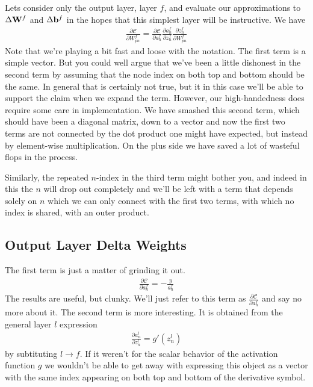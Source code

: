 \documentclass[twocolumn]{revtex4-1}
\newcommand{\bld}[1]{\vectorbold{#1}}
\newcommand{\cC}{\mathscr{C}}
\newcommand{\parpar}[2]{\frac{\partial #1}{\partial #2}}
\begin{document}
Lets consider only the output layer, layer $f$, and evaluate our approximations to $\Delta \bld{W}^f$ and $\Delta \bld{b}^f$ in the hopes that this simplest layer will be instructive. We have
\begin{align}
    \parpar{\cC}{W^f_{p n}} = \parpar{\cC}{a^f_n} \parpar{a^f_n}{z^f_n} \parpar{z^f_n}{W^f_{p n}}
\end{align}
Note that we're playing a bit fast and loose with the notation. The first term is a simple vector. But you could well argue that we've been a little dishonest in the second term by assuming that the node index on both top and bottom should be the same. In general that is certainly not true, but it in this case we'll be able to support the claim when we expand the term. However, our high-handedness does require some care in implementation. We have smashed this second term, which should have been a diagonal matrix, down to a vector and now the first two terms are not connected by the dot product one might have expected, but instead by element-wise multiplication. On the plus side we have saved a lot of wasteful flops in the process. 

Similarly, the repeated $n$-index in the third term might bother you, and indeed in this  the $n$ will drop out completely and we'll be left with a term that depends solely on $n$ which we can only connect with the first two terms, with which no index is shared, with an outer product.


\subsection{Output Layer Delta Weights}
The first term is just a matter of grinding it out.
\begin{align}
    \label{eqn:costWRTaF}
    \parpar{\cC}{a^f_n} = - \frac{y}{a^f_n}
\end{align}
The results are useful, but clunky. We'll just refer to this term as $\parpar{\cC}{a^f_n}$ and say no more about it. The second term is more interesting. It is obtained from the general layer $l$ expression
\begin{align}
    \label{eqn:aWRTzL}
    \parpar{a^l_n}{z^l_n} = g'(z^l_n)
\end{align}
by subtituting $l \rightarrow f$. If it weren't for the scalar behavior of the activation function $g$ we wouldn't be able to get away with expressing this object as a vector with the same index appearing on both top and bottom of the derivative symbol.
\end{document}
